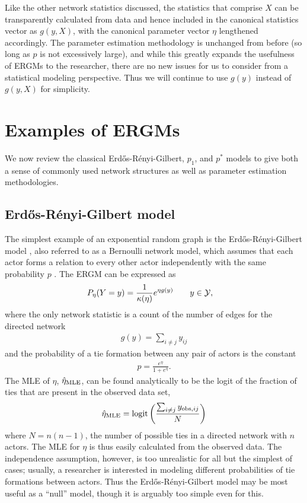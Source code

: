 Like the other network statistics discussed, the statistics that comprise $X$ can 
be transparently calculated from data and hence included in the canonical 
statistics vector as $g(y, X)$,
with the canonical parameter vector $\eta$ lengthened accordingly.
The parameter estimation methodology is unchanged from before (so long as $p$ is not
excessively large), and while this greatly expands the
usefulness of ERGMs to the researcher, there are no new issues for us to consider
from a statistical modeling perspective.
Thus we will continue to use $g(y)$ instead of $g(y,X)$ for simplicity.


\section{Examples of ERGMs} \label{S:ERGM examples}
We now review the classical Erd\H{o}s-R\'{e}nyi-Gilbert, $p_1$, and $p^*$ models to give both a sense of commonly used network structures as well as parameter estimation methodologies.

\subsection{Erd\H{o}s-R\'{e}nyi-Gilbert model} \label{S:Erdos}
The simplest example of an exponential random graph is the Erd\H{o}s-R\'{e}nyi-Gilbert 
model \citep{Erdos,Gilbert}, also referred to as a Bernoulli network model, which 
assumes that each actor forms a relation to every other actor independently with the 
same probability $p$ \citep{ergm}.  The ERGM can be expressed as
\begin{align*}
	P_{\eta}(Y=y) &= \frac{1}{\kappa( \eta) }e^{\eta g(y)}  \qquad y \in {\mathcal Y}, 
\end{align*}
where the only network statistic is a count of the number of edges for the directed network
\begin{align*}
	g(y) = \sum_{i \neq j} y_{ij}
\end{align*}
and the probability of a tie formation between any pair of actors is the constant
\begin{align*}
	p = \frac{e^{\eta}}{1+e^{\eta}}.
\end{align*}
The MLE of $\eta$, $\hat{\eta}_{\textrm{MLE}}$, can be found analytically to be the logit of the 
fraction of ties that are present in the observed data set, 
\begin{align*}
	\hat{\eta}_{\textrm{MLE}} = \operatorname{logit} \left ( \frac{\sum_{i \neq j} y_{\textrm{obs}, ij}}{ N } \right )
\end{align*}
where $N = n(n-1)$, the number of possible ties in a directed network with $n$ actors.  
The MLE 
for $\eta$ is thus easily calculated from the observed data. The independence 
assumption, however, is too unrealistic for all but the simplest of cases; usually, 
a researcher is interested in modeling different probabilities of tie formations 
between actors.  Thus the Erd\H{o}s-R\'{e}nyi-Gilbert model may be most 
useful as a ``null'' model, though it is arguably too simple even for this.


